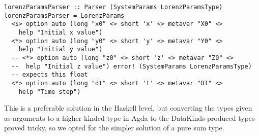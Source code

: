 \begin{verbatim}
lorenzParamsParser :: Parser (SystemParams LorenzParamsType)
lorenzParamsParser = LorenzParams
  <$> option auto (long "x0" <> short 'x' <> metavar "X0" <> 
    help "Initial x value")
  <*> option auto (long "y0" <> short 'y' <> metavar "Y0" <> 
    help "Initial y value")
  -- <*> option auto (long "z0" <> short 'z' <> metavar "Z0" <> 
  --  help "Initial z value") error! (SystemParams LorenzParamsType)
  -- expects this float
  <*> option auto (long "dt" <> short 't' <> metavar "DT" <> 
    help "Time step")
\end{verbatim}

This is a preferable solution in the Haskell level, but converting the types given as arguments to a higher-kinded type in Agda to the DataKinds-produced types proved tricky, so we opted for the simpler solution of a pure sum type.